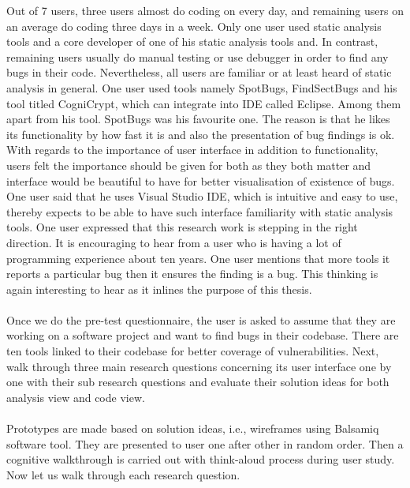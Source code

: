 Out of 7 users, three users almost do coding on every day, and remaining users on an average do coding three days in a week.  Only one user used static analysis tools and a core developer of one of his static analysis tools and. In contrast, remaining users usually do manual testing or use debugger in order to find any bugs in their code. Nevertheless, all users are familiar or at least heard of static analysis in general. One user used tools namely SpotBugs, FindSectBugs and his tool titled CogniCrypt, which can integrate into IDE called Eclipse. Among them apart from his tool. SpotBugs was his favourite one. The reason is that he likes its functionality by how fast it is and also the presentation of bug findings is ok. With regards to the importance of user interface in addition to functionality, users felt the importance should be given for both as they both matter and interface would be beautiful to have for better visualisation of existence of bugs. One user said that he uses Visual Studio IDE, which is intuitive and easy to use, thereby expects to be able to have such interface familiarity with static analysis tools. One user expressed that this research work is stepping in the right direction. It is encouraging to hear from a user who is having a lot of programming experience about ten years. One user mentions that more tools it reports a particular bug then it ensures the finding is a bug. This thinking is again interesting to hear as it inlines the purpose of this thesis. \\ \\ 

Once we do the pre-test questionnaire, the user is asked to assume that they are working on a software project and want to find bugs in their codebase. There are ten tools linked to their codebase for better coverage of vulnerabilities. Next, walk through three main research questions concerning its user interface one by one with their sub research questions and evaluate their solution ideas for both analysis view and code view. \\ \\

Prototypes are made based on solution ideas, i.e., wireframes using Balsamiq software tool. They are presented to user one after other in random order. Then a cognitive walkthrough is carried out with think-aloud process during user study. 
Now let us walk through each research question. \\ \\

